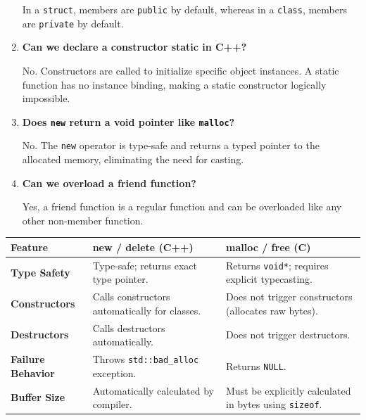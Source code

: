 \documentclass[12pt,a4paper]{article}
\newcommand{\Q}[1]{\textbf{#1}\par\noindent\ignorespaces}
\renewcommand{\arraystretch}{1.45}
\begin{document}
\begin{tcolorbox}[exambox, title={\textbf{Frequently Asked / Viva Questions}}]
\begin{enumerate}[topsep=0pt, label=\textbf{Q\arabic*.}, itemsep=5pt]
    In a \texttt{struct}, members are \texttt{public} by default, whereas in a \texttt{class}, members are \texttt{private} by default.
  \item \Q{Can we declare a constructor static in C++?}
    No. Constructors are called to initialize specific object instances. A static function has no instance binding, making a static constructor logically impossible.
  \item \Q{Does \texttt{new} return a void pointer like \texttt{malloc}?}
    No. The \texttt{new} operator is type-safe and returns a typed pointer to the allocated memory, eliminating the need for casting.
  \item \Q{Can we overload a friend function?}
    Yes, a friend function is a regular function and can be overloaded like any other non-member function.
\end{enumerate}
\end{tcolorbox}

\begin{tcolorbox}[tikzbox, title={Comparison: C++ dynamic operators vs. C memory functions}]
\renewcommand{\arraystretch}{1.45}
\par\noindent
\begin{tabularx}{\linewidth}{|B{3.2cm}|Y|Y|}
\hline
\textbf{Feature} & \textbf{\color{myteal}new / delete (C++)} & \textbf{\color{myamber}malloc / free (C)} \\
\hline
\textbf{Type Safety} & Type-safe; returns exact type pointer. & Returns \texttt{void*}; requires explicit typecasting. \\
\hline
\textbf{Constructors} & Calls constructors automatically for classes. & Does not trigger constructors (allocates raw bytes). \\
\hline
\textbf{Destructors} & Calls destructors automatically. & Does not trigger destructors. \\
\hline
\textbf{Failure Behavior} & Throws \texttt{std::bad\_alloc} exception. & Returns \texttt{NULL}. \\
\hline
\textbf{Buffer Size} & Automatically calculated by compiler. & Must be explicitly calculated in bytes using \texttt{sizeof}. \\
\hline
\end{tabularx}
\end{tcolorbox}
\end{document}
